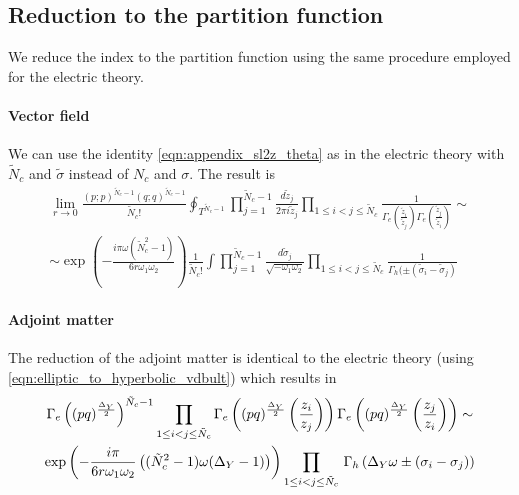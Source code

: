\subsection{Reduction to the partition function}
We reduce the index to the partition function using the same procedure employed for the electric theory.

\paragraph{Vector field}
We can use the identity \eqref{eqn:appendix_sl2z_theta} as in the electric theory with $\tilde{N}_c$ and $\tilde{\sigma}$ instead of $N_c$ and $\sigma$.  The result is
\begin{multline}
\lim_{r \rightarrow 0} \frac{ (p;p)^{\tilde{N}_c- 1}(q;q)^{\tilde{N}_c- 1} }{ \tilde{N}_c ! }
\oint_{T^{\tilde{N}_c -1}} \prod_{j=1}^{\tilde{N}_c -1 } \frac{ d \tilde{z}_j}{2 \pi i \tilde{z}_j} \prod_{1 \leq i<j \leq \tilde{N}_c } \frac{1}{\Gamma_e( \frac{\tilde{z}_i}{\tilde{z}_j} )\Gamma_e( \frac{\tilde{z}_j}{\tilde{z}_i} )} \sim
\\
\sim 
\exp \left(  
- \frac{ i \pi \omega (\tilde{N}_c^2 -1)}{6 r \omega_1 \omega_2}
\right)
 \frac{1}{\tilde{N}_c !} \int \prod_{j=1}^{\tilde{N}_c -1 } \frac{d \tilde{\sigma}_j}{\sqrt{- \omega_1 \omega_2} } \prod_{1 \leq i<j \leq \tilde{N}_c }\frac{1}{\Gamma_h( \pm (\tilde{\sigma}_i - \tilde{\sigma}_j) }
\end{multline}

\paragraph{Adjoint matter}
The reduction of the adjoint matter is identical to the electric theory (using \eqref{eqn:elliptic_to_hyperbolic_vdbult}) which results in
\begin{multline}
 \Gamma_e \left((pq)^{\frac{\Delta_Y}{2}} \right)^{\tilde{N}_c -1} 
 \prod_{1 \leq i <j \leq \tilde{N}_c} 
\Gamma_e \left( (pq)^{\frac{\Delta_Y}{2}} \left( { z_i \over z_j} \right) \right) \Gamma_e \left( (pq)^{\frac{\Delta_Y}{2}} \left( { z_j \over z_i} \right) \right) \sim \\
 \exp \left(- \frac{i \pi} {6 r \omega_1 \omega_2 }  \left( (\tilde{N}_c^2-1) \omega (\Delta_Y - 1)  \right) \right)   \prod_{1 \leq i <j \leq \tilde{N}_c} 
  \, \Gamma_h \left( \Delta_Y \omega \pm (\sigma_i - \sigma_j) \right) 
\end{multline}

